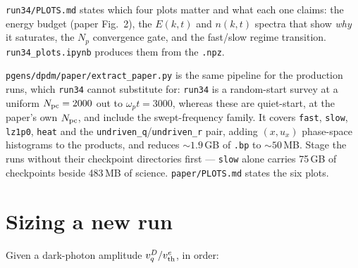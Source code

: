 \documentclass[11pt,a4paper]{article}
\newcommand{\code}[1]{\texttt{\small #1}}
\newcommand{\wpt}{\omega_p t}
\newcommand{\vth}{v_{\rm th}^{e}}
\newcommand{\Npc}{N_{\rm pc}}
\begin{document}
\code{run34/PLOTS.md} states which four plots matter and what each one claims: the
energy budget (paper Fig.~2), the $E(k,t)$ and $n(k,t)$ spectra that show
\emph{why} it saturates, the $N_p$ convergence gate, and the fast/slow regime
transition. \code{run34\_plots.ipynb} produces them from the \code{.npz}.

\code{pgens/dpdm/paper/extract\_paper.py} is the same pipeline for the production
runs, which \code{run34} cannot substitute for: \code{run34} is a random-start survey
at a uniform $\Npc = 2000$ out to $\wpt = 3000$, whereas these are quiet-start, at the
paper's own $\Npc$, and include the swept-frequency family. It covers \code{fast},
\code{slow}, \code{lz1p0}, \code{heat} and the \code{undriven\_q}/\code{undriven\_r}
pair, adding $(x,u_x)$ phase-space histograms to the products, and reduces
${\sim}1.9$\,GB of \code{.bp} to ${\sim}50$\,MB. Stage the runs without their
checkpoint directories first --- \code{slow} alone carries 75\,GB of checkpoints
beside 483\,MB of science. \code{paper/PLOTS.md} states the six plots.

\section{Sizing a new run}
\label{sec:sizing}

Given a dark-photon amplitude $v_q^D/\vth$, in order:
\end{document}
